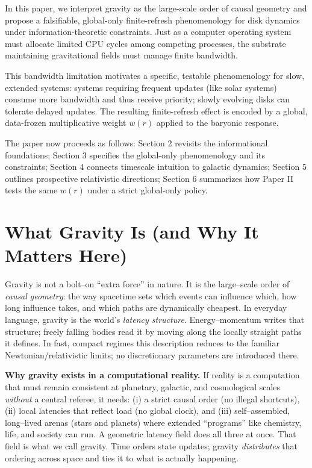 \documentclass[usenatbib]{mnras}
\begin{document}
In this paper, we interpret gravity as the large-scale order of causal geometry and propose a falsifiable, global-only finite-refresh phenomenology for disk dynamics under information-theoretic constraints. Just as a computer operating system must allocate limited CPU cycles among competing processes, the substrate maintaining gravitational fields must manage finite bandwidth.

This bandwidth limitation motivates a specific, testable phenomenology for slow, extended systems: systems requiring frequent updates (like solar systems) consume more bandwidth and thus receive priority; slowly evolving disks can tolerate delayed updates. The resulting finite-refresh effect is encoded by a global, data-frozen multiplicative weight $w(r)$ applied to the baryonic response.

The paper now proceeds as follows: Section 2 revisits the informational foundations; Section 3 specifies the global-only phenomenology and its constraints; Section 4 connects timescale intuition to galactic dynamics; Section 5 outlines prospective relativistic directions; Section 6 summarizes how Paper II tests the same $w(r)$ under a strict global-only policy.

\section{What Gravity Is (and Why It Matters Here)}
\label{sec:what-gravity-is}

Gravity is not a bolt–on “extra force” in nature. It is the large–scale order of \emph{causal geometry}: the way spacetime sets which events can influence which, how long influence takes, and which paths are dynamically cheapest. In everyday language, gravity is the world’s \emph{latency structure}. Energy–momentum writes that structure; freely falling bodies read it by moving along the locally straight paths it defines. In fast, compact regimes this description reduces to the familiar Newtonian/relativistic limits; no discretionary parameters are introduced there.

\vspace{0.5em}
\noindent\textbf{Why gravity exists in a computational reality.}
If reality is a computation that must remain consistent at planetary, galactic, and cosmological scales \emph{without} a central referee, it needs:
(i) a strict causal order (no illegal shortcuts),
(ii) local latencies that reflect load (no global clock),
and (iii) self–assembled, long–lived arenas (stars and planets) where extended “programs” like chemistry, life, and society can run.
A geometric latency field does all three at once. That field is what we call gravity.
Time orders state updates; gravity \emph{distributes} that ordering across space and ties it to what is actually happening.
\end{document}
